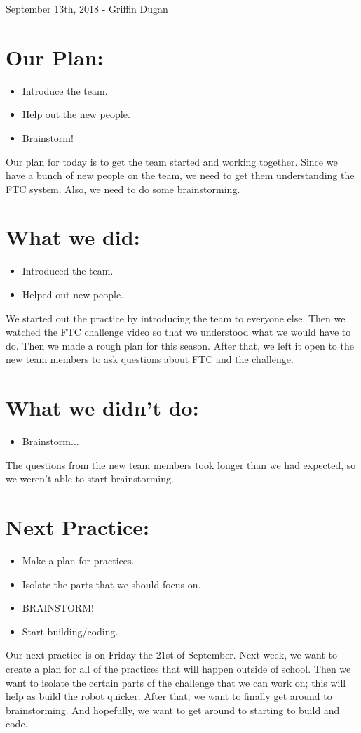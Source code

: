 \documentclass[12pt]{article}
\begin{document}
September 13th, 2018 - Griffin Dugan

\section{Our Plan:}
\begin{itemize}
	\item Introduce the team.
	\item Help out the new people.
	\item Brainstorm!
\end{itemize}

Our plan for today is to get the team started and working together. Since we have a bunch of new people on the team, we need to get them understanding the FTC system. Also, we need to do some brainstorming.

\section{What we did:}
\begin{itemize}
	\item Introduced the team.
	\item Helped out new people.
\end{itemize}

We started out the practice by introducing the team to everyone else. Then we watched the FTC challenge video so that we understood what we would have to do. Then we made a rough plan for this season. After that, we left it open to the new team members to ask questions about FTC and the challenge.

\section{What we didn't do:}
\begin{itemize}
	\item Brainstorm...
\end{itemize}

The questions from the new team members took longer than we had expected, so we weren't able to start brainstorming. 

\section{Next Practice:}
\begin{itemize}
	\item Make a plan for practices.
	\item Isolate the parts that we should focus on.
	\item BRAINSTORM!
	\item Start building/coding.
\end{itemize}

Our next practice is on Friday the 21st of September. Next week, we want to create a plan for all of the practices that will happen outside of school. Then we want to isolate the certain parts of the challenge that we can work on; this will help as build the robot quicker. After that, we want to finally get around to brainstorming. And hopefully, we want to get around to starting to build and code.
\end{document}
